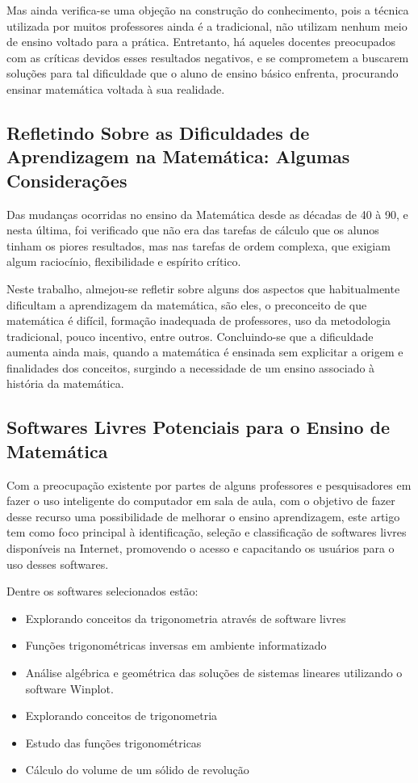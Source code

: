 \documentclass[12pt,a4paper]{article}
\begin{document}
Mas ainda verifica-se uma objeção na construção do conhecimento, pois a técnica utilizada por muitos professores ainda é a tradicional, não utilizam nenhum meio de ensino voltado para a prática. Entretanto, há aqueles docentes preocupados com as críticas devidos esses resultados negativos, e se comprometem a buscarem soluções para tal dificuldade que o aluno de ensino básico enfrenta, procurando ensinar matemática voltada à sua realidade. \citep{santos2008ensino}

\subsection{Refletindo Sobre as Dificuldades de Aprendizagem na Matemática: Algumas Considerações}
Das mudanças ocorridas no ensino da Matemática desde as décadas de 40 à 90, e nesta última, foi verificado que não era das tarefas de cálculo que os alunos tinham os piores resultados, mas nas tarefas de ordem complexa, que exigiam algum raciocínio, flexibilidade e espírito crítico.

Neste trabalho, almejou-se refletir sobre alguns dos aspectos que habitualmente dificultam a aprendizagem da matemática, são eles, o preconceito de que matemática é difícil, formação inadequada de professores, uso da metodologia tradicional, pouco incentivo, entre outros. Concluindo-se que a dificuldade aumenta ainda mais, quando a matemática é ensinada sem explicitar a origem e finalidades dos conceitos, surgindo a necessidade de um ensino associado à história da matemática. \citep{silva2005refletindo}

\subsection{Softwares Livres Potenciais para o Ensino de Matemática}
Com a preocupação existente por partes de alguns professores e pesquisadores em fazer o uso inteligente do computador em sala de aula, com o objetivo de fazer desse recurso uma possibilidade de melhorar o ensino aprendizagem, este artigo tem como foco principal à identificação, seleção e classificação de softwares livres disponíveis na Internet, promovendo o acesso e capacitando os usuários para o uso desses softwares. 

Dentre os softwares selecionados estão:
\begin{itemize}
	\item Explorando conceitos da trigonometria através de software livres
	\item Funções trigonométricas inversas em ambiente informatizado
	\item Análise algébrica e geométrica das soluções de sistemas lineares utilizando o software Winplot.
	\item Explorando conceitos de trigonometria
	\item Estudo das funções trigonométricas
	\item Cálculo do volume de um sólido de revolução
\end{itemize}
\citep{dosciatisoftwares}
\end{document}
